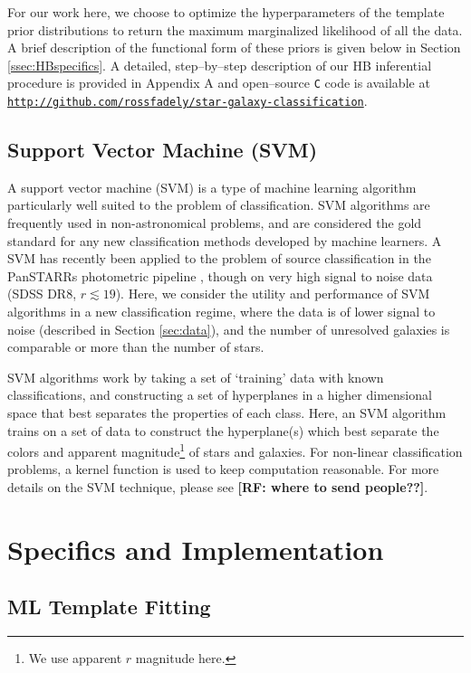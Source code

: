 \documentclass[12pt,preprint]{aastex}
\newcommand\rf[1]{{\bf [RF: #1]}}
\begin{document}
For our work here, we choose to optimize the hyperparameters of the template 
prior distributions to return the maximum marginalized likelihood of all the data.  A brief 
description of the functional form of these priors is given below in Section 
\ref{ssec:HBspecifics}.  A detailed, step--by--step description of our HB inferential procedure 
is provided in Appendix A and open--source \texttt{C} code is available at 
{\footnotesize \texttt{\url{http://github.com/rossfadely/star-galaxy-classification}}}. 

\subsection{Support Vector Machine (SVM)}
\label{ssec:SVMmethod}

A support vector machine (SVM) is a type of machine learning algorithm particularly 
well suited to the problem of classification.  SVM algorithms are frequently used in 
non-astronomical problems, and are considered the gold standard for any new 
classification methods developed by machine learners.  A SVM has recently been 
applied to the problem of source classification in the PanSTARRs photometric pipeline 
\citep{saglia12}, though on very high signal to noise data (SDSS DR8, $r\lesssim19$).  Here, 
we consider the utility and performance of SVM algorithms in a new classification regime, 
where the data is of lower signal to noise (described in Section \ref{sec:data}), and the 
number of unresolved galaxies is comparable or more than the number of stars.

SVM algorithms work by taking a set of `training' data with known classifications, and 
constructing a set of hyperplanes in a higher dimensional space that best separates 
the properties of each class.  Here, an SVM algorithm trains on a set of data to construct 
the hyperplane(s) which best separate the colors and apparent magnitude\footnote{We use 
apparent $r$ magnitude here.} of stars and galaxies.  For non-linear classification problems, 
a kernel function is used to keep computation reasonable.  For more details on the 
SVM technique, please see \rf{where to send people??}.

\section{Specifics and Implementation}
\label{sec:specifics}

\subsection{ML Template Fitting}
\label{ssec:MLspecifics}
\end{document}
